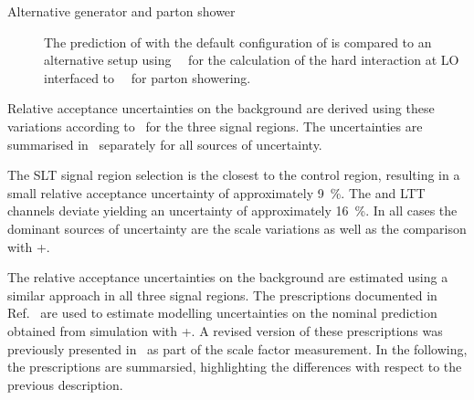 \begin{description}
\item[Alternative generator and parton shower] The prediction of
  \Zjets with the default configuration of \SHERPA[2.2.1] is compared
  to an alternative setup using~\MGNLO[2.2.2]~\cite{Alwall:2014hca}
  for the calculation of the hard interaction at LO interfaced
  to~\PYTHIA[8.186]~\cite{Sjostrand:2007gs} for parton showering.

\end{description}
Relative acceptance uncertainties on the \ZHF background are derived
using these variations according
to~ for the three signal
regions. The uncertainties are summarised
in~ separately for all sources of
uncertainty.


%   


The \lephad SLT signal region selection is the closest to the \ZHF
control region, resulting in a small relative acceptance uncertainty
of approximately \SI{9}{\percent}. The \hadhad and \lephad LTT
channels deviate yielding an uncertainty of approximately
\SI{16}{\percent}. In all cases the dominant sources of uncertainty
are the scale variations as well as the comparison with
\MGNLO+\PYTHIA[8].

The relative acceptance uncertainties on the \ttbar background are
estimated using a similar approach in all three signal regions. The
prescriptions documented in Ref.~\cite{ATL-PHYS-PUB-2020-023} are used
to estimate modelling uncertainties on the nominal prediction obtained
from simulation with \POWHEGBOX[v2]+\PYTHIA[8]. A revised version of
these prescriptions was previously presented
in~ as part of the \ttbarFakes scale
factor measurement. In the following, the prescriptions are
summarsied, highlighting the differences with respect to the previous
description.

